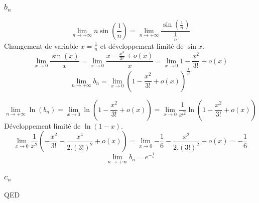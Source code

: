 \documentclass[]{book}
\theoremstyle{definition}
\begin{document}
\subsubsection*{$b_n$}
$$\lim_{n \to +\infty} n \sin(\frac{1}{n}) = \lim_{n \to +\infty} \frac{\sin(\frac{1}{n})}{\frac{1}{n}}$$
Changement de variable $x=\frac{1}{n}$ et d\'eveloppement limit\'e de $\sin x$.
$$\lim_{x \to 0} \frac{\sin(x)}{x} = \lim_{x \to 0} \frac{x-\frac{x^3}{3!}+o(x)}{x} = \lim_{x \to 0}{1-\frac{x^2}{3!}+o(x)}$$
$$\lim_{n \to +\infty} b_n = \lim_{x \to 0} {\left(1-\frac{x^2}{3!}+o(x)\right)^{\frac{1}{x^2}}}$$

$$\lim_{n \to +\infty} \ln( b_n ) = \lim_{x \to 0} {\ln \left(1-\frac{x^2}{3!}+o(x)\right)} = \lim_{x \to 0} {{\frac{1}{x^2}} \ln \left(1-\frac{x^2}{3!}+o(x)\right)}$$
D\'eveloppement limit\'e de $\ln(1-x)$.
$$\lim_{x \to 0} {{\frac{1}{x^2}}(-\frac{x^2}{3!}-\frac{x^4}{2.(3!)^2}+o(x))} = \lim_{x \to 0} {-\frac{1}{6}-\frac{x^2}{2.(3!)^2}+o(x)} = -\frac{1}{6}$$
$$\lim_{n \to +\infty} b_n  = e^{-\frac{1}{6}}$$

\subsubsection*{$c_n$}


QED
\end{document}
